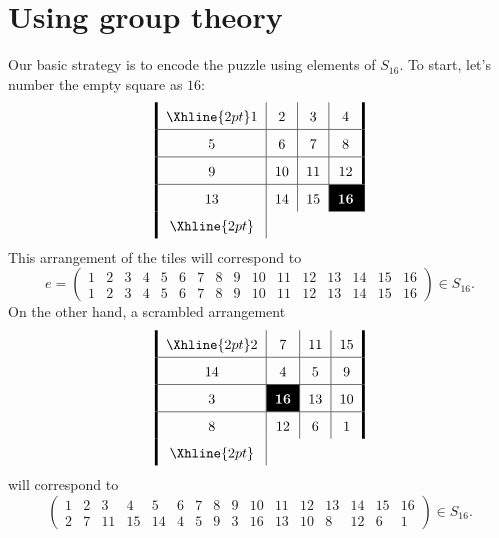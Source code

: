 \documentclass{ximera}
\begin{document}
\section{Using group theory}

Our basic strategy is to encode the puzzle using elements of $S_{16}$.
To start, let's number the empty square as $16$:
\[
\arraycolsep=6pt\def\arraystretch{1.6}
\begin{array}{!{\vline width 2pt}c|c|c|c!{\vline width 2pt}}
    \Xhline{2pt}
    1  & 2  & 3  & 4 \\ \hline
    5  & 6  & 7  & 8 \\ \hline
    9  & 10 & 11 & 12 \\ \hline
    13 & 14 & 15 & \cellcolor{black}\textcolor{white}{\boldsymbol{16}} \\
    \Xhline{2pt}
\end{array}
\]
This arrangement of the tiles will correspond to
\[
e = \left(\begin{smallmatrix}
  1 & 2 & 3 & 4 & 5 & 6 & 7 & 8 & 9 & 10 & 11 & 12 & 13 & 14 & 15 & 16\\
  1 & 2 & 3 & 4 & 5 & 6 & 7 & 8 & 9 & 10 & 11 & 12 & 13 & 14 & 15 & 16
\end{smallmatrix}\right)\in S_{16}.
\]
On the other hand, a scrambled arrangement 
\[
\arraycolsep=6pt\def\arraystretch{1.6}
\begin{array}{!{\vline width 2pt}c|c|c|c!{\vline width 2pt}}
    \Xhline{2pt}
    2 & 7  & 11 & 15\\ \hline
    14 & 4  & 5  & 9 \\ \hline
    3  & \cellcolor{black}\textcolor{white}{\boldsymbol{16}}  & 13 & 10  \\ \hline
    8  & 12 & 6 & 1 \\
    \Xhline{2pt}
\end{array}
\]
will correspond to
\[
\left(\begin{smallmatrix}
  1 & 2 & 3 & 4 & 5 & 6 & 7 & 8 & 9 & 10 & 11 & 12 & 13 & 14 & 15 & 16\\
  2 & 7 & 11& 15& 14& 4 & 5 & 9 & 3 & 16  & 13 &  10 &  8 & 12 & 6 & 1
\end{smallmatrix}\right)\in S_{16}.
\]
\end{document}
